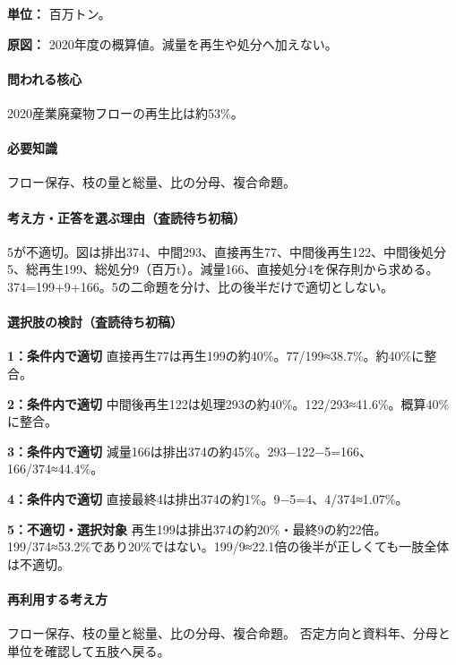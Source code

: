 \noindent\textbf{単位：} 百万トン。\par

\noindent\textbf{原図：} 2020年度の概算値。減量を再生や処分へ加えない。\par

\paragraph{問われる核心} 2020産業廃棄物フローの再生比は約53\%。

\paragraph{必要知識} フロー保存、枝の量と総量、比の分母、複合命題。

\paragraph{考え方・正答を選ぶ理由（査読待ち初稿）} 5が不適切。図は排出374、中間293、直接再生77、中間後再生122、中間後処分5、総再生199、総処分9（百万t）。減量166、直接処分4を保存則から求める。374=\allowbreak{}199+9+166。5の二命題を分け、比の後半だけで適切としない。

\paragraph{選択肢の検討（査読待ち初稿）}\mbox{}\par

\noindent\textbf{1：条件内で適切} 直接再生77は再生199の約40\%。77/199≈38.7\%。約40\%に整合。\par

\noindent\textbf{2：条件内で適切} 中間後再生122は処理293の約40\%。122/293≈41.6\%。概算40\%に整合。\par

\noindent\textbf{3：条件内で適切} 減量166は排出374の約45\%。293−122−5=\allowbreak{}166、166/374≈44.4\%。\par

\noindent\textbf{4：条件内で適切} 直接最終4は排出374の約1\%。9−5=\allowbreak{}4、4/374≈1.07\%。\par

\noindent\textbf{5：不適切・選択対象} 再生199は排出374の約20\%・最終9の約22倍。199/374≈53.2\%であり20\%ではない。199/9≈22.1倍の後半が正しくても一肢全体は不適切。\par

\paragraph{再利用する考え方} フロー保存、枝の量と総量、比の分母、複合命題。 否定方向と資料年、分母と単位を確認して五肢へ戻る。

